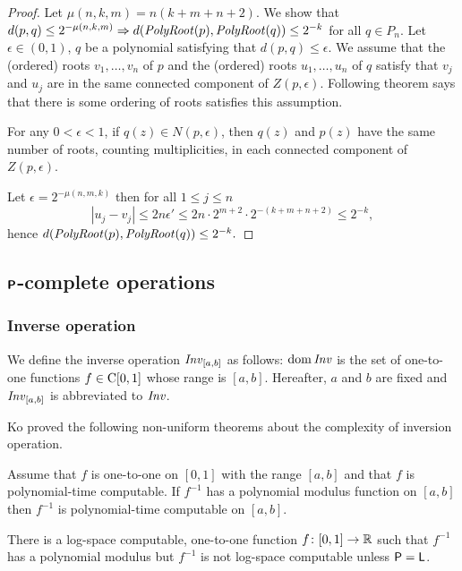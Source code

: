 \documentclass[envcountsame,orivec,oribibl]{llncs}
\begin{document}
\begin{proof}
Let $\mu(n, k, m) = n(k+m+n+2)$.
We show that 
$
d(p, q) \le 2^{-\mu(n, k, m)} \Rightarrow d(\mathit{PolyRoot}(p), \mathit{PolyRoot}(q)) \le 2^{-k}
$
for all $q \in P_n$.
Let $\epsilon \in (0,1)$, $q$ be a polynomial satisfying that
 $d(p, q) \le \epsilon$.
We assume that the (ordered) roots $v_1, \dots, v_n$ of $p$
and the (ordered) roots $u_1, \dots, u_n$ of $q$ satisfy that
$v_j$ and $u_j$ are in the same connected component of $Z(p, \epsilon)$.
Following theorem says that there is some ordering of roots satisfies this assumption.
\begin{theorem}
\label{theorem: root neighborhoods 2}
 For any $0 < \epsilon < 1$, if $q(z) \in N(p, \epsilon)$,
 then $q(z)$ and $p(z)$ have the same number of roots,
 counting multiplicities, in each connected component of $Z(p, \epsilon)$.
\end{theorem}
Let $\epsilon = 2^{-\mu(n,m,k)}$ then for all $1 \le j \le n$
\begin{equation}
 |u_j - v_j| 
 \le
 2n\epsilon'
 \le
 2n \cdot 2^{m+2} \cdot 2^{-(k+m+n+2)} 
 \le
 2^{-k},
\end{equation}
hence
$
 d(\mathit{PolyRoot}(p), \mathit{PolyRoot}(q)) \le 2^{-k}.
$
\end{proof}

\subsection{$\text{\bfseries \sffamily \upshape P}$-complete operations}
\label{section:P-complete}

\subsubsection{Inverse operation}

We define the inverse operation $\mathit{Inv}_{[a,b]}$ as follows:
$\mathop{\rm dom} \mathit{Inv}$ is the set of one-to-one functions $f \in \mathrm C[0,1]$
whose range is $[a,b]$.
Hereafter, $a$ and $b$ are fixed and $\mathit{Inv}_{[a,b]}$ is abbreviated to $\mathit{Inv}$.

Ko proved the following non-uniform theorems about the complexity of 
inversion operation.
\begin{theorem}
\label{theorem:ko1991-4.7}
Assume that $f$ is one-to-one on $[0,1]$ with the range $[a, b]$ and that 
$f$ is polynomial-time computable. 
If $f^{-1}$ has a polynomial modulus function on $[a,b]$ then
$f^{-1}$ is polynomial-time computable on $[a, b]$.
\end{theorem}
\begin{theorem}
\label{theorem:ko1991-4.18}
There is a log-space computable, one-to-one function $f \colon [0, 1] \to \mathbb R$
such that $f^{-1}$ has a polynomial modulus 
but $f^{-1}$ is not log-space computable
unless $\mathsf{P} = \mathsf{L}$.
\end{theorem}
\end{document}
